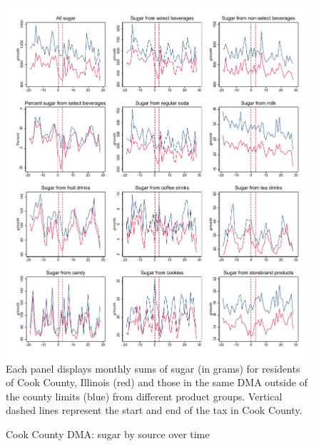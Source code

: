 \documentclass[12pt]{article}
\begin{document}
\clearpage
\begin{figure}[t]
\begin{center}
\caption{Cook County DMA: sugar by source over time}
\label{cook_panelist_sugar_sources}
\includegraphics[width=1\textwidth, angle=0]{../figures/panelist_sugar_sources.pdf}
\footnotesize Each panel displays monthly sums of sugar (in grams) for residents of Cook County, Illinois (red) and those in the same DMA outside of the county limits (blue) from different product groups. Vertical dashed lines represent the start and end of the tax in Cook County.
\end{center}
\end{figure}
\end{document}
